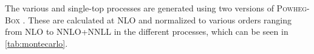 The various \ttbar and single-top processes\cite{ATL-PHYS-PUB-2016-004} are generated using two versions of \textsc{Powheg-Box} \cite{ATL-PHYS-PUB-2016-004,powheg-box}.
These are calculated at NLO and normalized to various orders ranging from NLO to NNLO+NNLL in the different processes, which can be seen in \ref{tab:montecarlo}\cite{Czakon:2013goa,Czakon:2011xx,Aliev:2010zk,Kant:2014oha,Kidonakis:2010ux,Kidonakis:2011wy}.

